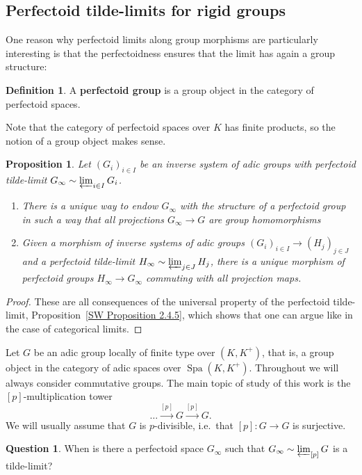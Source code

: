 \documentclass[10pt,oneside]{amsart}
\newtheorem{proposition}[theorem]{Proposition}
\theoremstyle{definition}
\newtheorem{definition}[theorem]{Definition}
\newtheorem{question}[theorem]{Question}
\newcommand{\Spa}{\operatorname{Spa}}
\begin{document}
\subsection{Perfectoid tilde-limits for rigid groups}

One reason why perfectoid limits along group morphisms are particularly interesting is that the perfectoidness ensures that the limit has again a group structure:

\begin{definition}
	A \textbf{perfectoid group} is a group object in the category of perfectoid spaces.
\end{definition}

Note that the category of perfectoid spaces over $K$ has finite products, so the notion of a group object makes sense. 

\begin{proposition}\label{perfectoid tilde-limit is perfectoid group in a functorial way}
	Let $(G_i)_{i\in I}$ be an inverse system of adic groups with perfectoid tilde-limit $G_\infty\sim \varprojlim_{i\in I}G_i$.
	\begin{enumerate}
		\item  There is a unique way to endow $G_\infty$ with the structure of a perfectoid group in such a way that all projections $G_\infty\rightarrow G$ are group homomorphisms
		\item Given a morphism of inverse systems of adic groups $(G_i)_{i\in I}\to (H_j)_{j\in J}$ and a perfectoid tilde-limit $H_\infty\sim\varprojlim_{j\in J}H_j$, there is a unique morphism of perfectoid groups $H_\infty\rightarrow G_\infty$
		commuting with all projection maps.
	\end{enumerate}
\end{proposition}
\begin{proof}
	These are all consequences of the universal property of the perfectoid tilde-limit, Proposition~\ref{SW Proposition 2.4.5}, which shows that one can argue like in the case of categorical limits.
\end{proof}

Let $G$ be an adic group locally of finite type over $(K,K^+)$, that is, a group object in the category of adic spaces over $\Spa(K,K^+)$. Throughout we will always consider commutative groups. The main topic of study of this work is the $[p]$-multiplication tower
\[ \dots\xrightarrow{[p]}G\xrightarrow{[p]}G.\]
We will usually assume that $G$ is $p$-divisible, i.e.\ that $[p]:G\to G$ is surjective.
\begin{question}\label{qu:tilde-limits-of-adic-groups}
	When is there a perfectoid space $G_\infty$ such that $G_\infty \sim \varprojlim_{[p]} G$ is a tilde-limit?
\end{question}
\end{document}
